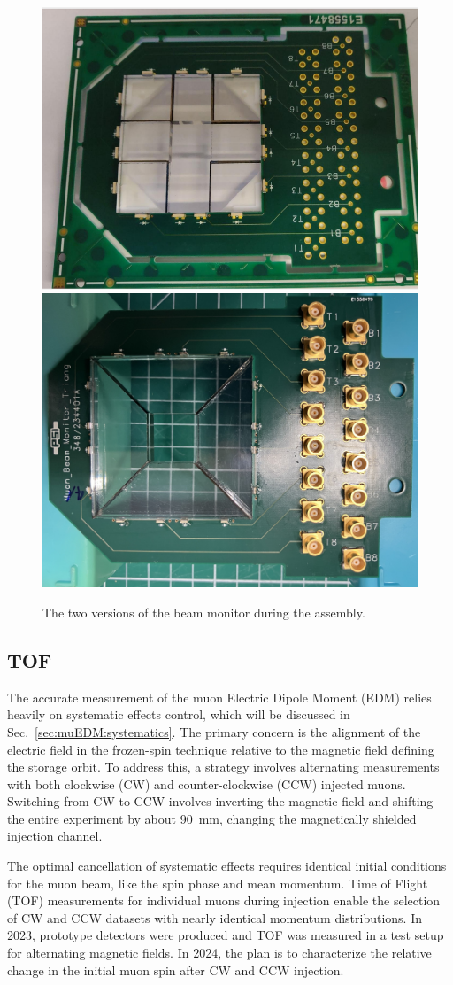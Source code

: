 \begin{refsection}
        
        \begin{figure}
            \centering
            \includegraphics[width=0.4\linewidth]{Figures/muEDM/BeamMonitor/BeamMonRect.png}
            \hspace{0.8cm}
            \includegraphics[width=0.4\linewidth]{Figures/muEDM/BeamMonitor/BeamMonTriang4.png}
            
            \caption{The two versions of the beam monitor during the assembly.}
            \label{fig:BeamMonAssembly}
        \end{figure}

    \subsection{TOF}
        The accurate measurement of the muon Electric Dipole Moment (EDM) relies heavily on systematic effects control, which will be discussed in Sec.~\ref{sec:muEDM:systematics}. 
        The primary concern is the alignment of the electric field in the frozen-spin technique relative to the magnetic field defining the storage orbit. 
        To address this, a strategy involves alternating measurements with both clockwise (CW) and counter-clockwise (CCW) injected muons. 
        Switching from CW to CCW involves inverting the magnetic field and shifting the entire experiment by about \SI{90}{mm}, changing the magnetically shielded injection channel.
        
        The optimal cancellation of systematic effects requires identical initial conditions for the muon beam, like the spin phase and mean momentum. 
        Time of Flight (TOF) measurements for individual muons during injection enable the selection of CW and CCW datasets with nearly identical momentum distributions. 
        In 2023, prototype detectors were produced and TOF was measured in a test setup for alternating magnetic fields. 
        In 2024, the plan is to characterize the relative change in the initial muon spin after CW and CCW injection.
        

\end{refsection}
